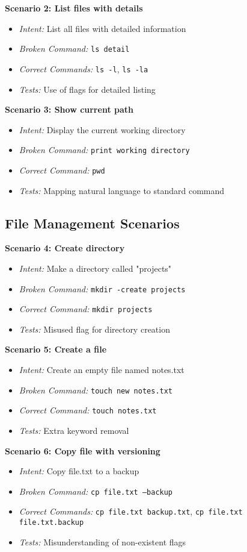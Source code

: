 \textbf{Scenario 2: List files with details}
\begin{itemize}
	\item \textit{Intent:} List all files with detailed information
	\item \textit{Broken Command:} \texttt{ls detail}
	\item \textit{Correct Commands:} \texttt{ls -l}, \texttt{ls -la}
	\item \textit{Tests:} Use of flags for detailed listing
\end{itemize}

\textbf{Scenario 3: Show current path}
\begin{itemize}
	\item \textit{Intent:} Display the current working directory
	\item \textit{Broken Command:} \texttt{print working directory}
	\item \textit{Correct Command:} \texttt{pwd}
	\item \textit{Tests:} Mapping natural language to standard command
\end{itemize}

\subsection{File Management Scenarios}

\textbf{Scenario 4: Create directory}
\begin{itemize}
	\item \textit{Intent:} Make a directory called "projects"
	\item \textit{Broken Command:} \texttt{mkdir -create projects}
	\item \textit{Correct Command:} \texttt{mkdir projects}
	\item \textit{Tests:} Misused flag for directory creation
\end{itemize}

\textbf{Scenario 5: Create a file}
\begin{itemize}
	\item \textit{Intent:} Create an empty file named notes.txt
	\item \textit{Broken Command:} \texttt{touch new notes.txt}
	\item \textit{Correct Command:} \texttt{touch notes.txt}
	\item \textit{Tests:} Extra keyword removal
\end{itemize}

\textbf{Scenario 6: Copy file with versioning}
\begin{itemize}
	\item \textit{Intent:} Copy file.txt to a backup
	\item \textit{Broken Command:} \texttt{cp file.txt --backup}
	\item \textit{Correct Commands:} \texttt{cp file.txt backup.txt}, \texttt{cp file.txt file.txt.backup}
	\item \textit{Tests:} Misunderstanding of non-existent flags
\end{itemize}

